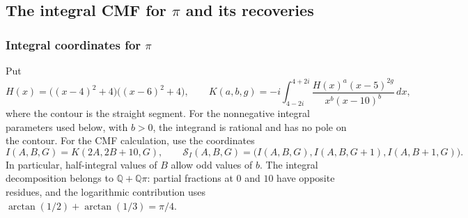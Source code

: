 \documentclass[oneside,english,11pt]{amsart}
\begin{document}
\FloatBarrier
{}
\subsection{The integral CMF for \texorpdfstring{$\pi$}{pi} and its recoveries}
\label{app:pi-build-recovery}
\subsubsection{Integral coordinates for \texorpdfstring{$\pi$}{pi}}
\label{sec:pi-integral-data}
Put
\[
 H(x)=\bigl((x-4)^2+4\bigr)\bigl((x-6)^2+4\bigr),
 \qquad
 K(a,b,g)=-i\int_{4-2i}^{4+2i}
       \frac{H(x)^a(x-5)^{2g}}{x^b(x-10)^b}\,dx,
\]
where the contour is the straight segment.  For the nonnegative integral
parameters used below, with $b>0$, the integrand is rational and has no pole
on the contour.  For the CMF calculation, use the coordinates
\begin{equation}\label{eq:pi-I-K-coordinates}
 I(A,B,G)=K(2A,2B+10,G),\qquad
 \mathcal S_I(A,B,G)=
 \bigl(I(A,B,G),I(A,B,G+1),I(A,B+1,G)\bigr).
\end{equation}
In particular, half-integral values of $B$ allow odd values of $b$.
The integral decomposition belongs to $\mathbb Q+\mathbb Q\pi$:
partial fractions at $0$ and $10$ have opposite residues, and the logarithmic
contribution uses $\arctan(1/2)+\arctan(1/3)=\pi/4$.

\end{document}
